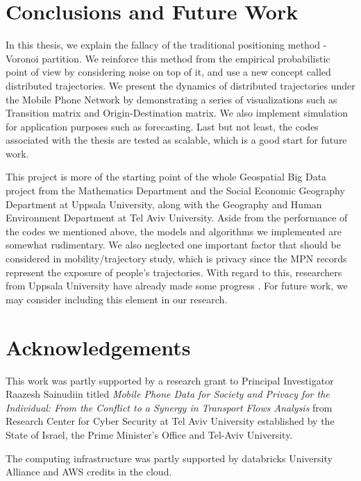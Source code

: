 \documentclass[12pt]{article}
\theoremstyle{definition}
\begin{document}



\section{Conclusions and Future Work}
In this thesis, we explain the fallacy of the traditional positioning method - Voronoi partition. We reinforce this method from the empirical probabilistic point of view by considering noise on top of it, and use a new concept called distributed trajectories. We present the dynamics of distributed trajectories under the Mobile Phone Network by demonstrating a series of visualizations such as Transition matrix and Origin-Destination matrix. We also implement simulation for application purposes such as forecasting. Last but not least, the codes associated with the thesis are tested as scalable, which is a good start for future work.

This project is more of the starting point of the whole Geospatial Big Data project from the Mathematics Department and the Social Economic Geography Department at Uppsala University, along with the Geography and Human Environment Department at Tel Aviv University. Aside from the performance of the codes we mentioned above, the models and algorithms we implemented are somewhat rudimentary. We also neglected one important factor that should be considered in mobility/trajectory study, which is privacy since the MPN records represent the exposure of people’s trajectories. With regard to this, researchers from Uppsala University have already made some progress \cite{privacy_traj_co-traj_2019}. For future work, we may consider including this element in our research. \newpage

\section*{Acknowledgements}

This work was partly supported by a research grant to Principal Investigator Raazesh Sainudiin titled 
{\em Mobile Phone Data for Society and Privacy for the Individual: From the Conflict to a Synergy in Transport Flows Analysis} 
from Research Center for Cyber Security at Tel Aviv University established by the State of Israel, 
the Prime Minister’s Office and Tel-Aviv University. 

The computing infrastructure was partly supported by databricks University Alliance and AWS credits in the cloud.
\newpage



\end{document}
